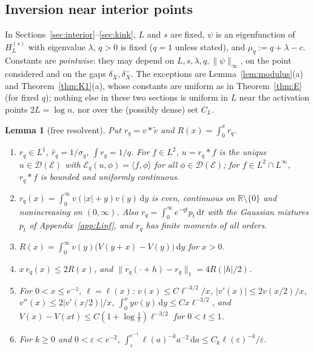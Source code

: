 \documentclass[11pt]{amsart}
\newcommand{\R}{\mathbb{R}}
\newcommand{\cE}{\mathcal{E}}
\newcommand{\dd}{\,\mathrm{d}}
\newcommand{\eps}{\varepsilon}
\newtheorem{lemma}[theorem]{Lemma}
\theoremstyle{definition}
\theoremstyle{remark}
\numberwithin{equation}{section}
\begin{document}
\subsection{Inversion near interior points}
In Sections~\ref{sec:interior}--\ref{sec:kink}, $L$ and $s$ are fixed, $\psi$ is an eigenfunction of $H^{(s)}_L$ with eigenvalue $\lambda$, $q>0$ is fixed ($q=1$ unless stated), and $\mu_q:=q+\lambda-c$. Constants are \emph{pointwise}: they may depend on $L,s,\lambda,q,\|\psi\|_\infty$, on the point considered and on the gaps $\delta_X,\delta^-_X$. The exceptions are Lemma~\ref{lem:modulus}(a) and Theorem~\ref{thm:K1}(a), whose constants are uniform as in Theorem~\ref{thm:E} (for fixed $q$); nothing else in these two sections is uniform in $L$ near the activation points $2L=\log n$, nor over the (possibly dense) set $C_L$.

\begin{lemma}[free resolvent]\label{lem:rq}
Put $r_q=v*\tilde v$ and $R(x)=\int_0^xr_q$.
\begin{enumerate}
\item[(a)] $r_q\in L^1$, $\hat r_q=1/\sigma_q$, $\int r_q=1/q$. For $f\in L^2$, $u=r_q*f$ is the unique $u\in \mathcal D(\cE)$ with $\cE_q(u,\phi)=\langle f,\phi\rangle$ for all $\phi\in \mathcal D(\cE)$; for $f\in L^2\cap L^\infty$, $r_q*f$ is bounded and uniformly continuous.
\item[(b)] $r_q(x)=\int_0^\infty v(|x|+y)v(y)\dd y$ is even, continuous on $\R\setminus\{0\}$ and nonincreasing on $(0,\infty)$. Also $r_q=\int_0^\infty e^{-qt}p_t\dd t$ with the Gaussian mixtures $p_t$ of Appendix~\ref{app:Linf}, and $r_q$ has finite moments of all orders.
\item[(c)] $R(x)=\int_0^\infty v(y)\bigl(V(y+x)-V(y)\bigr)\dd y$ for $x>0$.
\item[(d)] $x\,r_q(x)\le2R(x)$, and $\|r_q(\cdot+h)-r_q\|_1=4R(|h|/2)$.
\item[(e)] For $0<x\le e^{-1}$, $\ell=\ell(x)$: $v(x)\le C\ell^{-3/2}/x$, $|v'(x)|\le2v(x/2)/x$, $v''(x)\le2|v'(x/2)|/x$, $\int_0^xyv(y)\dd y\le Cx\ell^{-3/2}$, and $V(x)-V(xt)\le C(1+\log\frac1t)\ell^{-3/2}$ for $0<t\le1$.
\item[(f)] For $k\ge0$ and $0<\eps<e^{-2}$, $\int_\eps^{e^{-1}}\ell(a)^{-k}a^{-2}\dd a\le C_k\ell(\eps)^{-k}/\eps$.
\end{enumerate}
\end{lemma}
\end{document}
